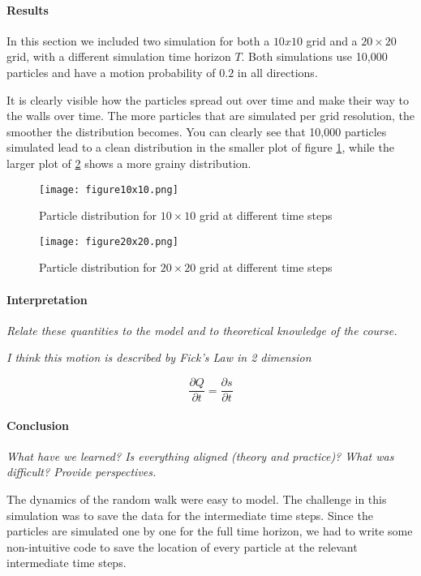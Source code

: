 \paragraph{Results}
In this section we included two simulation for both a $10x10$ grid and a $20 \times 20$ grid, with a different simulation time horizon $T$. Both simulations use 10,000 particles and have a motion probability of $0.2$ in all directions. \newline

It is clearly visible how the particles spread out over time and make their way to the walls over time. The more particles that are simulated per grid resolution, the smoother the distribution becomes. You can clearly see that 10,000 particles simulated lead to a clean distribution in the smaller plot of figure \ref{fig:RandomWalk10}, while the larger plot of \ref{fig:RandomWalk20} shows a more grainy distribution.

\begin{figure}[htb]
    \label{fig:RandomWalk10}
	\centering
	\texttt{[image: figure10x10.png]}       
	\caption{Particle distribution for $10 \times 10$ grid at different time steps}
\end{figure}

\begin{figure}[htb]
    \label{fig:RandomWalk20}
	\centering
	\texttt{[image: figure20x20.png]}       
	\caption{Particle distribution for $20 \times 20$ grid at different time steps}
\end{figure}


 
\paragraph{Interpretation}
{\it Relate these quantities to the model and to theoretical knowledge of the course.}\newline

{\it I think this motion is described by Fick's Law in 2 dimension}

\begin{equation}
\label{eq:FicksLaw}
\frac{\partial Q}{\partial t} = \frac{\partial s}{\partial t}
\end{equation}


 \paragraph{Conclusion}
 \textit{What have we learned? Is everything aligned (theory and practice)? What was difficult? Provide perspectives.}
 
 The dynamics of the random walk were easy to model. The challenge in this simulation was to save the data for the intermediate time steps. Since the particles are simulated one by one for the full time horizon, we had to write some non-intuitive code to save the location of every particle at the relevant intermediate time steps.
 
